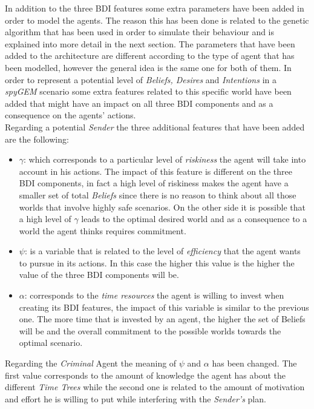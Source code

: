 \documentclass[a4paper]{article}
\begin{document}
In addition to the three BDI features some extra parameters have been added in order to model the agents. The reason this has been done is related to the genetic algorithm that has been used in order to simulate their behaviour and is explained into more detail in the next section. The parameters that have been added to the architecture are different according to the type of agent that has been modelled, however the general idea is the same one for both of them. In order to represent a potential level of \textit{Beliefs, Desires} and \textit{Intentions} in a \textit{spyGEM} scenario some extra features related to this specific world have been added that might have an impact on all three BDI components and as a consequence on the agents' actions. \\
Regarding a potential \textit{Sender} the three additional features that have been added are the following:
\begin{itemize}
\item $\gamma$: which corresponds to a particular level of \textit{riskiness} the agent will take into account in his actions. The impact of this feature is different on the three BDI components, in fact a high level of riskiness makes the agent have a smaller set of total \textit{Beliefs} since there is no reason to think about all those worlds that involve highly safe scenarios. On the other side it is possible that a high level of $\gamma$ leads to the optimal desired world and as a consequence to a world the agent thinks requires commitment.  
\item $\psi$: is a variable that is related to the level of \textit{efficiency} that the agent wants to pursue in its actions. In this case the higher this value is the higher the value of the three BDI components will be. 
\item $\alpha$: corresponds to the \textit{time resources} the agent is willing to invest when creating its BDI features, the impact of this variable is similar to the previous one. The more time that is invested by an agent, the higher the set of Beliefs will be and the overall commitment to the possible worlds towards the optimal scenario.
\end{itemize}

Regarding the \textit{Criminal} Agent the meaning of $\psi$ and $\alpha$ has been changed. The first value corresponds to the amount of knowledge the agent has about the different \textit{Time Trees} while the second one is related to the amount of motivation and effort he is willing to put while interfering with the \textit{Sender's} plan. \\
    
\end{document}
